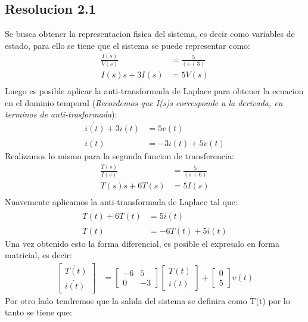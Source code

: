\documentclass[
  11pt,
  letterpaper,
   addpoints,
   answers
  ]{exam}
\begin{document}
\begin{questions}
\begin{solution}
\subsection*{Resolucion 2.1}
Se busca obtener la representacion fisica del sistema, es decir como variables de estado, para ello se tiene que el sistema se puede representar como:
\begin{align}
    \frac{I(s)}{V(s)} &= \frac{5}{(s+3)}\\
    I(s)s  + 3I(s) &= 5V(s)\\
\end{align}
Luego es posible aplicar la anti-transformada de Laplace para obtener la ecuacion en el dominio temporal (\textit{Recordemos que I(s)s corresponde a la derivada, en terminos de anti-trasformada}):
\begin{align}
    \dot{i(t)} + 3i(t) &= 5v(t)\\
    \dot{i(t)} &= -3i(t) + 5v(t)
\end{align}
Realizamos lo mismo para la segunda funcion de transferencia:
\begin{align}
    \frac{T(s)}{I(s)} &= \frac{5}{(s+6)}\\
    T(s)s + 6T(s) &= 5I(s)\\
\end{align}
Nuavemente aplicamos la anti-transformada de Laplace tal que:
\begin{align}
    \dot{T(t)} + 6T(t) &= 5i(t)\\
    \dot{T(t)} &= -6T(t) + 5i(t)
\end{align}
Una vez obtenido esto la forma diferencial, es posible el expresalo en forma matricial, es decir:
\begin{align}
    \begin{bmatrix}
        \dot{T(t)}\\
        \dot{i(t)}
    \end{bmatrix}
    &=
    \begin{bmatrix}
        -6 & 5\\
        0 & -3
    \end{bmatrix}
    \begin{bmatrix}
        T(t)\\
        i(t)
    \end{bmatrix}
    +
    \begin{bmatrix}
        0\\
        5
    \end{bmatrix}
    v(t)
\end{align}
Por otro lado tendremos que la salida del sistema se definira como T(t) por lo tanto se tiene que:

\end{solution}
\end{questions}
\end{document}
